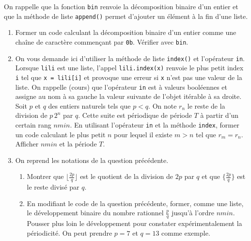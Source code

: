 On rappelle que la fonction \texttt{bin} renvoie la décomposition binaire d'un entier et que la méthode de liste \texttt{append()} permet d'ajouter un élément à la fin d'une liste.
\begin{enumerate}
  \item Former un code calculant la décomposition binaire d'un entier comme une chaîne de caractère commençant par \texttt{0b}. Vérifier avec \texttt{bin}.
  
  \item On vous demande ici d'utiliser la  méthode de liste \texttt{index()} et l'opérateur \texttt{in}.\newline
  Lorsque \texttt{lili} est une liste, l'appel \texttt{lili.index(x)} renvoie le plus petit index \texttt{i} tel que \texttt{x = lili[i]} et provoque une erreur si \texttt{x} n'est pas une valeur de la liste.\newline
  On rappelle (cours) que l'opérateur \texttt{in} est à valeurs booléennes et assigne au nom à sa gauche la valeur suivante de l'objet itérable à sa droite.\newline
  Soit $p$ et $q$ des entiers naturels tels que $p < q$. On note $r_n$ le reste de la division de $p\,2^n$ par $q$. Cette suite est périodique de période $T$ à partir d'un certain rang $nmin$.\newline
  En utilisant l'opérateur \texttt{in} et la méthode \texttt{index}, former un code calculant le plus petit $n$ pour lequel il existe $m>n$ tel que $r_m = r_n$. Afficher $nmin$ et la période $T$.
  
  \item On reprend les notations de la question précédente.\label{dev_bin}
\begin{enumerate}
  \item Montrer que $\lfloor \frac{2p}{q} \rfloor$ est le quotient de la division de $2p$ par $q$ et que $\{ \frac{2p}{q} \}$ est le reste divisé par $q$. 
  \item En modifiant le code de la question précédente, former, comme une liste, le développement binaire du nombre rationnel $\frac{p}{q}$ jusqu'à l'ordre $nmin$. Pousser plus loin le développement pour constater expérimentalement la périodicité. On peut prendre $p=7$ et $q=13$ comme exemple.
\end{enumerate}


\end{enumerate}
